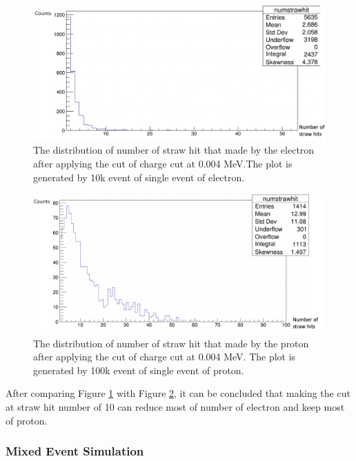 \documentclass[12pt]{extarticle}
\begin{document}
\begin{figure}[H]
\centering
\includegraphics[width=0.9\linewidth]{figure/electron_sh.png}
\caption{The distribution of number of straw hit that made by the electron after applying the cut of charge cut at 0.004 MeV.The plot is generated by 10k event of single event of electron.}
\label{electron_sh}
\end{figure}


\begin{figure}[H]
\centering
\includegraphics[width=0.9\linewidth]{figure/proton_sh.png}
\caption{The distribution of number of straw hit that made by the proton after applying the cut of charge cut at 0.004 MeV. The plot is generated by 100k event of single event of proton.}
\label{proton_sh}
\end{figure}
\noindent After comparing Figure \ref{electron_sh} with Figure \ref{proton_sh}, it can be concluded that making the cut at straw hit number of 10 can reduce most of number of electron and keep most of proton. 

\subsubsection{Mixed Event Simulation }
\end{document}
